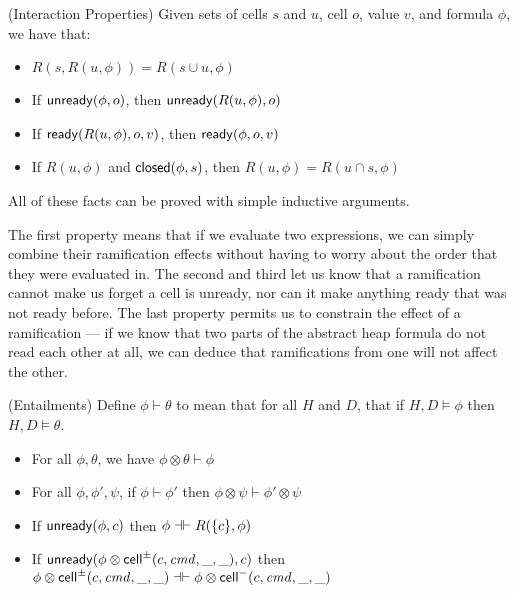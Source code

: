 \begin{prop}{(Interaction Properties)}
Given sets of cells $s$ and $u$, cell $o$, value $v$, and formula $\phi$, we have
that:
\begin{itemize}
\item $R(s, R(u, \phi)) = R(s \cup u, \phi)$
\item If $\mathsf{unready}({\phi}, {o})$, then $\mathsf{unready}({R(u, \phi)}, {o})$ 
\item If $\mathsf{ready}({R(u, \phi)}, {o}, {v})$, then $\mathsf{ready}({\phi}, {o}, {v})$ 
\item If $R(u, \phi)$ and $\mathsf{closed}({\phi}, {s})$, then $R(u, \phi) = R(u \cap s, \phi)$ 
\end{itemize}
\end{prop}

All of these facts can be proved with simple inductive arguments. 

The first property means that if we evaluate two expressions, we can
simply combine their ramification effects without having to worry
about the order that they were evaluated in. The second and third let
us know that a ramification cannot make us forget a cell is unready,
nor can it make anything ready that was not ready before. The last
property permits us to constrain the effect of a ramification --- if we
know that two parts of the abstract heap formula do not read each
other at all, we can deduce that ramifications from one will not
affect the other.

\begin{prop}{(Entailments)}
Define $\phi \vdash \theta$ to mean that for all $H$ and $D$, that if $H, D \models \phi$ then 
$H, D \models \theta$. 

\begin{itemize}
\item For all $\phi, \theta$, we have $\phi \otimes \theta \vdash \phi$
\item For all $\phi, \phi', \psi$, if $\phi \vdash \phi'$ then $\phi \otimes \psi \vdash \phi' \otimes \psi$  
\item If $\mathsf{unready}({\phi}, {c})$ then $\phi \dashv\vdash R(\{{c}\}, \phi)$
\item If $\mathsf{unready}({\phi \otimes \mathsf{cell}^{\pm}({c}, {\mathit{cmd}}, {\_}, {\_})}, {c})$ then $\phi \otimes \mathsf{cell}^{\pm}({c}, {\mathit{cmd}}, {\_}, {\_}) \dashv\vdash \phi \otimes \mathsf{cell}^{-}({c}, {\mathit{cmd}}, {\_}, {\_})$
\end{itemize}
\end{prop}

